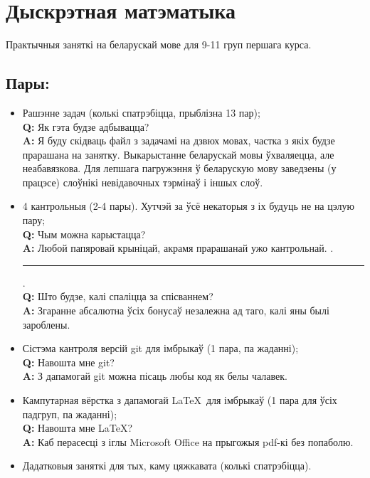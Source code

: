 \documentclass[12pt, a4paper]{extarticle}
\newcommand{\formQA}[2]{%
	\noindent \textbf{Q:} #1 \\
	\textbf{A:} #2
}
\begin{document}
	\section{Дыскрэтная матэматыка}
	Практычныя заняткі на беларускай мове для 9-11 груп першага курса. 	\subsection{Пары:}
	\begin{itemize}
		\item Рашэнне задач (колькі спатрэбіцца, прыблізна 13 пар); \\[6pt]
		\formQA{Як гэта будзе адбывацца?}
		{Я буду скідваць файл з задачамі на дзвюх мовах, частка з якіх будзе прарашана на занятку. Выкарыстанне беларускай мовы ўхваляецца, але неабавязкова. Для лепшага пагружэння ў беларускую мову заведзены (у працэсе) слоўнікі невідавочных тэрмінаў і іншых слоў.}
		\item 4 кантрольныя (2-4 пары). Хутчэй за ўсё некаторыя з іх будуць не на цэлую пару; \\[6pt]
		\formQA{Чым можна карыстацца?}
		{Любой папяровай крыніцай, акрамя прарашанай ужо кантрольнай. .\noindent\rule{0.5cm}{0.4pt}. \\[6pt]}
		\formQA{Што будзе, калі спаліцца за спісваннем?}
		{Згаранне абсалютна ўсіх бонусаў незалежна ад таго, калі яны былі зароблены.}
		\item Сістэма кантроля версій git для імбрыкаў (1 пара, па жаданні); \\[6pt]
		\formQA{Навошта мне git?}
		{З дапамогай git можна пісаць любы код як белы чалавек.}
		\item Кампутарная вёрстка з дапамогай \LaTeX~для імбрыкаў (1 пара для ўсіх падгруп, па жаданні); \\[6pt]
		\formQA{Навошта мне \LaTeX?}
		{Каб перасесці з іглы Microsoft Office на прыгожыя pdf-кі без попаболю.}
		\item Дадатковыя заняткі для тых, каму цяжкавата (колькі спатрэбіцца).
	\end{itemize}
\end{document}
